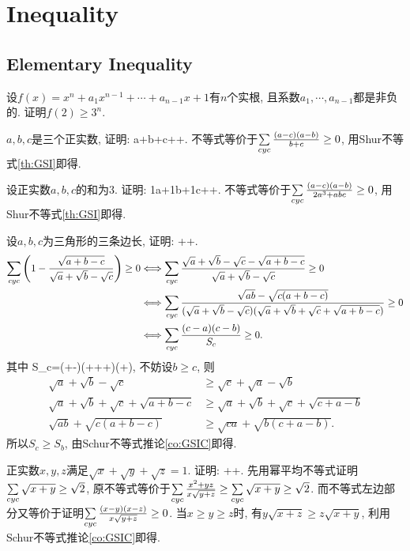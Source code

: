 \chapter{Inequality}
\section{Elementary Inequality}
\bq{}{}
设$f(x)=x^n+a_1x^{n-1}+\cdots+a_{n-1}x+1$有$n$个实根, 且系数$a_1,\cdots,a_{n-1}$都是非负的. 证明$f(2)\ge3^n$.
\eq

$a,b,c$是三个正实数, 证明:
\bee
a+b+c\le{}++.
\eee
\eq
\ba
不等式等价于$\sum\limits_{cyc}\frac{(a-c)(a-b)}{b+c}\ge0$, 用Shur不等式\ref{th:GSI}即得.
\ea

\bq{}{}
设正实数$a,b,c$的和为$3$. 证明:
\bee
\frac1a+\frac1b+\frac1c\ge{}++.
\eee
\eq
\ba
不等式等价于$\sum\limits_{cyc}\frac{(a-c)(a-b)}{2a^3+abc}\ge0$, 用Shur不等式\ref{th:GSI}即得.
\ea

设$a,b,c$为三角形的三条边长, 证明:
\bee
{}++.
\eee
\eq
\ba
\begin{align*}
\sum\limits_{cyc}\left(1-\frac{\sqrt{a+b-c}}{\sqrt{a}+\sqrt{b}-\sqrt{c}}\right)\ge0
  & \Longleftrightarrow\sum\limits_{cyc}\frac{\sqrt{a}+\sqrt{b}-\sqrt{c}-\sqrt{a+b-c}}{\sqrt{a}+\sqrt{b}-\sqrt{c}}\ge0\\
  & \Longleftrightarrow\sum\limits_{cyc}\frac{\sqrt{ab}-\sqrt{c(a+b-c)}}{(\sqrt{a}+\sqrt{b}-\sqrt{c})(\sqrt{a}+\sqrt{b}+\sqrt{c}+\sqrt{a+b-c})}\ge0\\
  & \Longleftrightarrow\sum\limits_{cyc}\frac{(c-a)(c-b)}{S_c}\ge0.
\end{align*}
其中
\bee
S_c=(+-)(+++)(+),
\eee
不妨设$b\ge c$, 则
\begin{align*}
\sqrt{a}+\sqrt{b}-\sqrt{c}&\ge\sqrt{c}+\sqrt{a}-\sqrt{b}\\
\sqrt{a}+\sqrt{b}+\sqrt{c}+\sqrt{a+b-c}&\ge\sqrt{a}+\sqrt{b}+\sqrt{c}+\sqrt{c+a-b}\\
\sqrt{ab}+\sqrt{c(a+b-c)}&\ge\sqrt{ca}+\sqrt{b(c+a-b)}.
\end{align*}
所以$S_c\ge S_b$, 由Schur不等式推论\ref{co:GSIC}即得.
\ea

正实数$x,y,z$满足$\sqrt{x}+\sqrt{y}+\sqrt{z}=1$. 证明:
\bee
{}++.
\eee
\eq
\ba
先用幂平均不等式证明$\sum\limits_{cyc}\sqrt{x+y}\ge\sqrt{2}$, 原不等式等价于$\sum\limits_{cyc}\frac{x^2+yz}{x\sqrt{y+z}}\ge\sum\limits_{cyc}\sqrt{x+y}\ge\sqrt{2}$.
而不等式左边部分又等价于证明$\sum\limits_{cyc}\frac{(x-y)(x-z)}{x\sqrt{y+z}}\ge0$. 当$x\ge y\ge z$时, 有$y\sqrt{x+z}\ge z\sqrt{x+y}$, 
利用Schur不等式推论\ref{co:GSIC}即得.
\ea

